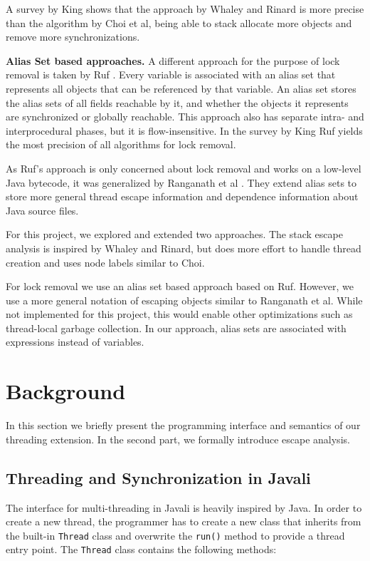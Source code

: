 \documentclass[letterpaper]{article}
\newcommand{\mypar}[1]{{\bf #1.}}
\begin{document}
A survey by King \cite{King:04} shows that the approach by Whaley and Rinard is more precise
than the algorithm by Choi et al, being able to stack allocate more objects and
remove more synchronizations.

\mypar{Alias Set based approaches}
A different approach for the purpose of lock removal is taken by Ruf \cite{Ruf:00}.
Every variable is associated with an alias set that represents all objects that
can be referenced by that variable. An alias set stores the alias sets of all
fields reachable by it, and whether the objects it represents are synchronized
or globally reachable. This approach also has separate intra- and interprocedural
phases, but it is flow-insensitive. In the survey by  King \cite{King:04} Ruf
yields the most precision of all algorithms for lock removal.

As Ruf's approach is only concerned about lock removal and works on a low-level
Java bytecode, it was generalized by Ranganath et al \cite{Ranganath:04}.
They extend alias sets to store more general thread escape information
and dependence information about Java source files.

For this project, we explored and extended two approaches. The stack escape analysis
is inspired by Whaley and Rinard, but does more effort to handle thread creation
and uses node labels similar to Choi.

For lock removal we use an alias set based approach based on Ruf. However, we
use a more general notation of escaping objects similar to Ranganath et al. While
not implemented for this project, this would enable other optimizations such
as thread-local garbage collection. In our approach, alias sets are associated
with expressions instead of variables.


\section{Background}\label{sec:background}

In this section we briefly present the programming interface and semantics of our
threading extension. In the second part, we formally introduce escape analysis.

\subsection{Threading and Synchronization in Javali}
The interface for multi-threading in Javali is heavily inspired by Java. In
order to create a new thread, the programmer has to create a new class that
inherits from the built-in \texttt{Thread} class and overwrite the \texttt{run()}
method to provide a thread entry point. 
The \texttt{Thread} class contains the following methods:
\end{document}
